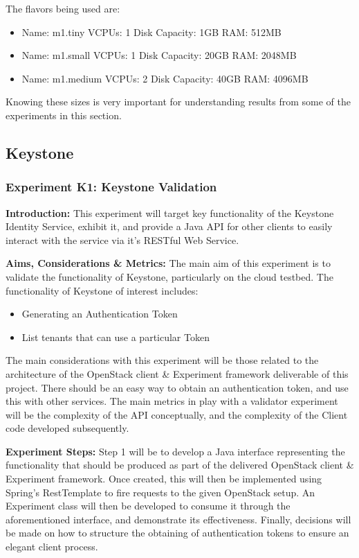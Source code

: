 The flavors being used are:
\begin{itemize}
\item Name: m1.tiny   VCPUs: 1 Disk Capacity: 1GB  RAM: 512MB
\item Name: m1.small  VCPUs: 1 Disk Capacity: 20GB RAM: 2048MB
\item Name: m1.medium VCPUs: 2 Disk Capacity: 40GB RAM: 4096MB
\end{itemize}

Knowing these sizes is very important for understanding results from some of the experiments in this section. 

\subsection{Keystone}

\subsubsection{Experiment K1: Keystone Validation}
\textbf{Introduction:}
This experiment will target key functionality of the Keystone Identity Service, exhibit it, and provide a Java API for other clients to easily interact with the service via it's RESTful Web Service. 

\textbf{Aims, Considerations \& Metrics:}
The main aim of this experiment is to validate the functionality of Keystone, particularly on the cloud testbed. The functionality of Keystone of interest includes:

\begin{itemize}
\itemsep0em
\item Generating an Authentication Token
\item List tenants that can use a particular Token
\end{itemize}

The main considerations with this experiment will be those related to the architecture of the OpenStack client \& Experiment framework deliverable of this project. There should be an easy way to obtain an authentication token, and use this with other services. 
The main metrics in play with a validator experiment will be the complexity of the API conceptually, and the complexity of the Client code developed subsequently. 

\textbf{Experiment Steps:}
Step 1 will be to develop a Java interface representing the functionality that should be produced as part of the delivered OpenStack client \& Experiment framework. Once created, this will then be implemented using Spring's RestTemplate to fire requests to the given OpenStack setup. 
An Experiment class will then be developed to consume it through the aforementioned interface, and demonstrate its effectiveness.  
Finally, decisions will be made on how to structure the obtaining of authentication tokens to ensure an elegant client process. 

